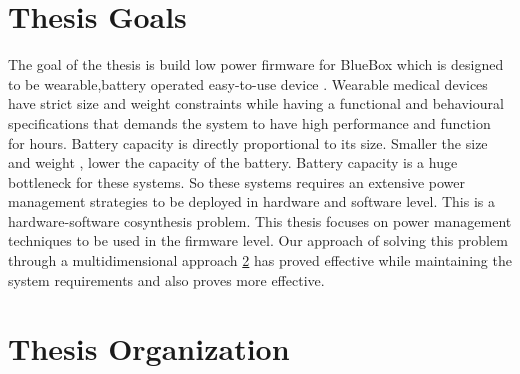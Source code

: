 \section{Thesis Goals}
The goal of the thesis is build low power firmware for BlueBox which is designed to be wearable,battery operated easy-to-use device . Wearable medical devices have strict size and weight constraints while having a functional and behavioural specifications that demands the system to have high performance and function for hours. Battery capacity is directly proportional to its size. Smaller the size and weight , lower the capacity of the battery\cite{}. Battery capacity is a huge bottleneck for these systems. So these systems requires an extensive power management strategies to be deployed in hardware and software level. This is a hardware-software cosynthesis problem. 
This thesis focuses on power management techniques to be used in the firmware level. Our approach of solving this problem through a multidimensional approach \ref{} has proved effective while maintaining the system requirements and also proves more effective.

 
\section{Thesis Organization}

